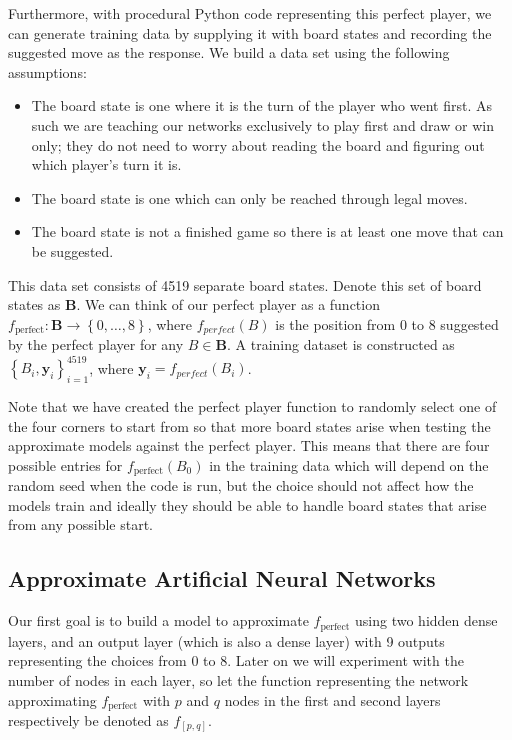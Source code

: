 \documentclass{somasmsc}
\begin{document}
Furthermore, with procedural Python code representing this perfect player, we can generate training data by supplying it with board states and recording the suggested move as the response. We build a data set using the following assumptions:
\begin{itemize}
    \item The board state is one where it is the turn of the player who went first. As such we are teaching our networks exclusively to play first and draw or win only; they do not need to worry about reading the board and figuring out which player's turn it is.
    \item The board state is one which can only be reached through legal moves.
    \item The board state is not a finished game so there is at least one move that can be suggested.
\end{itemize}

This data set consists of 4519 separate board states. Denote this set of board states as $\mathbf{B}$. We can think of our perfect player as a function $f_{\text{perfect}} : \mathbf{B} \rightarrow \left\{0, \dots, 8\right\}$, where $f_{perfect}\left(B\right)$ is the position from 0 to 8 suggested by the perfect player for any $B \in \mathbf{B}$. A training dataset is constructed as $\left\{B_i, \pmb{y}_i\right\}_{i=1}^{4519}$, where $\pmb{y}_i = f_{perfect}\left(B_i\right)$.

Note that we have created the perfect player function to randomly select one of the four corners to start from so that more board states arise when testing the approximate models against the perfect player. This means that there are four possible entries for $f_{\text{perfect}}\left(B_0\right)$ in the training data which will depend on the random seed when the code is run, but the choice should not affect how the models train and ideally they should be able to handle board states that arise from any possible start.

\subsection{Approximate Artificial Neural Networks}

Our first goal is to build a model to approximate $f_{\text{perfect}}$ using two hidden dense layers, and an output layer (which is also a dense layer) with 9 outputs representing the choices from 0 to 8. Later on we will experiment with the number of nodes in each layer, so let the function representing the network approximating $f_{\text{perfect}}$ with $p$ and $q$ nodes in the first and second layers respectively be denoted as $f_{\left[p,q\right]}$.
\end{document}
